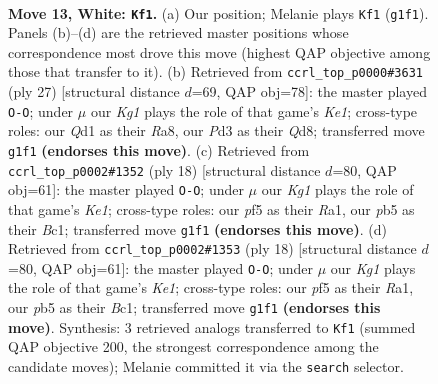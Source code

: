 \documentclass[11pt]{article}
\begin{document}
\clearpage

\begin{figure}[p]\centering
\begin{subfigure}{0.46\textwidth}\centering
\resizebox{\linewidth}{!}{%
\newchessgame
\chessboard[
  setfen={rnbqk2r/2p1b3/p2p4/1p1Ppppp/8/1B1P1N1P/PPP2PP1/R1BQR1K1 w kq - 0 13},
  showmover=false,
  pgfstyle=straightmove, color=movearrow, markmove={g1-f1}
]}
\caption{}
\end{subfigure}\hfill
\begin{subfigure}{0.46\textwidth}\centering
\resizebox{\linewidth}{!}{%
\newchessgame
\chessboard[
  setfen={r2qk2r/1pp1bppp/nn1p2b1/p2P4/P1PN2P1/R6P/1P1NBP2/2BQK2R b Kkq - 2 14},
  showmover=false,
  pgfstyle=straightmove, color=movearrow, markmove={e8-g8}
]}
\caption{}
\end{subfigure}
\\[4pt]
\begin{subfigure}{0.46\textwidth}\centering
\resizebox{\linewidth}{!}{%
\newchessgame
\chessboard[
  setfen={r1bqk2r/1p1p1ppp/p1n1p3/2b5/P1BpP3/3P4/1PP1NPPP/R1BQK2R w KQkq - 1 10},
  showmover=false,
  pgfstyle=straightmove, color=movearrow, markmove={e1-g1}
]}
\caption{}
\end{subfigure}\hfill
\begin{subfigure}{0.46\textwidth}\centering
\resizebox{\linewidth}{!}{%
\newchessgame
\chessboard[
  setfen={r1bqk2r/1p1p1ppp/p1n1p3/2b5/P1BpP3/3P4/1PP1NPPP/R1BQK2R w KQkq - 1 10},
  showmover=false,
  pgfstyle=straightmove, color=movearrow, markmove={e1-g1}
]}
\caption{}
\end{subfigure}
\caption{\textbf{Move 13, White: \texttt{Kf1}.} (a) Our position; Melanie plays \texttt{Kf1} (\texttt{g1f1}). Panels (b)--(d) are the retrieved master positions whose correspondence most drove this move (highest QAP objective among those that transfer to it). (b) Retrieved from \texttt{ccrl\_top\_p0000\#3631} (ply 27) [structural distance $d$=69, QAP obj=78]: the master played \texttt{O-O}; under $\mu$ our \emph{Kg1} plays the role of that game's \emph{Ke1}; cross-type roles: our \emph{Q}d1 as their \emph{R}a8, our \emph{P}d3 as their \emph{Q}d8; transferred move \texttt{g1f1} \textbf{(endorses this move)}. (c) Retrieved from \texttt{ccrl\_top\_p0002\#1352} (ply 18) [structural distance $d$=80, QAP obj=61]: the master played \texttt{O-O}; under $\mu$ our \emph{Kg1} plays the role of that game's \emph{Ke1}; cross-type roles: our \emph{p}f5 as their \emph{R}a1, our \emph{p}b5 as their \emph{B}c1; transferred move \texttt{g1f1} \textbf{(endorses this move)}. (d) Retrieved from \texttt{ccrl\_top\_p0002\#1353} (ply 18) [structural distance $d$=80, QAP obj=61]: the master played \texttt{O-O}; under $\mu$ our \emph{Kg1} plays the role of that game's \emph{Ke1}; cross-type roles: our \emph{p}f5 as their \emph{R}a1, our \emph{p}b5 as their \emph{B}c1; transferred move \texttt{g1f1} \textbf{(endorses this move)}. Synthesis: 3 retrieved analogs transferred to \texttt{Kf1} (summed QAP objective 200, the strongest correspondence among the candidate moves); Melanie committed it via the \texttt{search} selector.}
\label{fig:thought-m24}
\end{figure}
\end{document}
